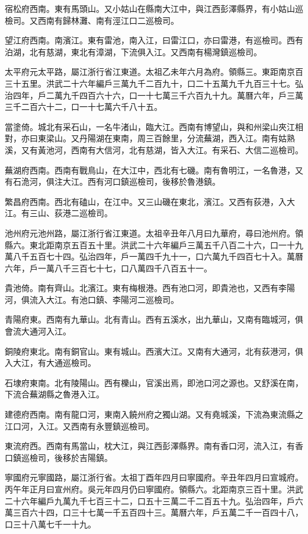宿松府西南。東有馬頭山。又小姑山在縣南大江中，與江西彭澤縣界，有小姑山巡檢司。又西南有歸林灘、南有涇江口二巡檢司。

望江府西南。南濱江。東有雷池，南入江，曰雷江口，亦曰雷港，有巡檢司。西有泊湖，北有慈湖，東北有漳湖，下流俱入江。又西南有楊灣鎮巡檢司。

太平府元太平路，屬江浙行省江東道。太祖乙未年六月為府。領縣三。東距南京百三十五里。洪武二十六年編戶三萬九千二百九十，口二十五萬九千九百三十七。弘治四年，戶二萬九千四百六十六，口一十七萬三千六百九十九。萬曆六年，戶三萬三千二百六十二，口一十七萬六千八十五。

當塗倚。城北有采石山，一名牛渚山，臨大江。西南有博望山，與和州梁山夾江相對，亦曰東梁山。又丹陽湖在東南，周三百餘里，分流蕪湖，西入江。南有姑熟溪，又有黃池河，西南有大信河，北有慈湖，皆入大江。有采石、大信二巡檢司。

蕪湖府西南。西南有戰鳥山，在大江中，西北有七磯。南有魯明江，一名魯港，又有石洈河，俱注大江。西有河口鎮巡檢司，後移於魯港鎮。

繁昌府西南。西北有磕山，在江中。又三山磯在東北，濱江。又西有荻港，入大江。有三山、荻港二巡檢司。

池州府元池州路，屬江浙行省江東道。太祖辛丑年八月曰九華府，尋曰池州府。領縣六。東北距南京五百五十里。洪武二十六年編戶三萬五千八百二十六，口一十九萬八千五百七十四。弘治四年，戶一萬四千九十一，口六萬九千四百七十入。萬曆六年，戶一萬八千三百七十七，口八萬四千八百五十一。

貴池倚。南有齊山。北濱江。東有梅根港。西有池口河，即貴池也，又西有李陽河，俱流入大江。有池口鎮、李陽河二巡檢司。

青陽府東。西南有九華山。北有青山。西有五溪水，出九華山，又南有臨城河，俱會流大通河入江。

銅陵府東北。南有銅官山。東有城山。西濱大江。又南有大通河，北有荻港河，俱入大江，有大通巡檢司。

石埭府東南。北有陵陽山。西有櫟山，官溪出焉，即池口河之源也。又舒溪在南，下流合蕪湖縣之魯港入江。

建德府西南。南有龍口河，東南入饒州府之獨山湖。又有堯城溪，下流為東流縣之江口河，入江。又西南有永豐鎮巡檢司。

東流府西。西南有馬當山，枕大江，與江西彭澤縣界。南有香口河，流入江，有香口鎮巡檢司，後移於吉陽鎮。

寧國府元寧國路，屬江浙行省。太祖丁酉年四月曰寧國府。辛丑年四月曰宣城府。丙午年正月曰宣州府。吳元年四月仍曰寧國府。領縣六。北距南京三百十里。洪武二十六年編戶九萬九千七百三十二，口五十三萬二千二百五十九。弘治四年，戶六萬三百六十四，口三十七萬一千五百四十三。萬曆六年，戶五萬二千一百四十八，口三十八萬七千一十九。


